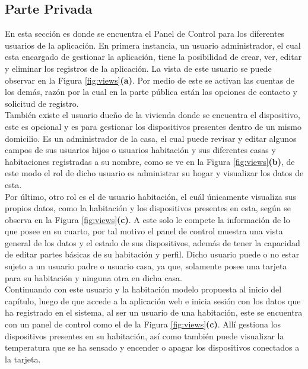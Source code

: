 \subsection{Parte Privada}

En esta sección es donde se encuentra el Panel de Control para los diferentes usuarios de la aplicación. En primera instancia, un usuario administrador, el cual esta encargado de gestionar la aplicación, tiene la posibilidad de crear, ver, editar y eliminar los registros de la aplicación. La vista de este usuario se puede observar en la Figura \ref{fig:views}\textbf{(a)}. Por medio de este se activan las cuentas de los demás, razón por la cual en la parte pública están las opciones de contacto y solicitud de registro.\\

También existe el usuario dueño de la vivienda donde se encuentra el dispositivo, este es opcional y es para gestionar los dispositivos presentes dentro de un mismo domicilio. Es un administrador de la casa, el cual puede revisar y editar algunos campos de sus usuarios hijos o usuarios habitación y sus diferentes casas y habitaciones registradas a su nombre, como se ve en la Figura \ref{fig:views}\textbf{(b)}, de este modo el rol de dicho usuario es administrar su hogar y visualizar los datos de esta.\\

Por último, otro rol es el de usuario habitación, el cuál únicamente visualiza sus propios datos, como la habitación y los dispositivos presentes en esta, según se observa en la Figura \ref{fig:views}\textbf{(c)}. A este solo le compete la información de lo que posee en su cuarto, por tal motivo el panel de control muestra una vista general de los datos y el estado de sus dispositivos, además de tener la capacidad de editar partes básicas de su habitación y perfil. Dicho usuario puede o no estar sujeto a un usuario padre o usuario casa, ya que, solamente posee una tarjeta para su habitación y ninguna otra en dicha casa.\\

Continuando con este usuario y la habitación modelo propuesta al inicio del capítulo, luego de que accede a la aplicación web e inicia sesión con los datos que ha registrado en el sistema, al ser un usuario de una habitación, este se encuentra con un panel de control como el de la Figura \ref{fig:views}\textbf{(c)}. Allí gestiona los dispositivos presentes en su habitación, así como también puede visualizar la temperatura que se ha sensado y encender o apagar los dispositivos conectados a la tarjeta.\\

